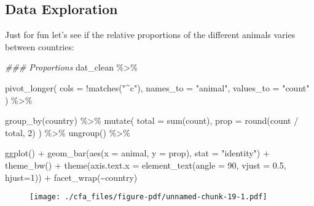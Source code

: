 \documentclass[
  letterpaper,
  DIV=11,
  numbers=noendperiod]{scrreprt}
\newenvironment{Shaded}{\begin{snugshade}}{\end{snugshade}}
\newcommand{\AttributeTok}[1]{\textcolor[rgb]{0.40,0.45,0.13}{#1}}
\newcommand{\DecValTok}[1]{\textcolor[rgb]{0.68,0.00,0.00}{#1}}
\newcommand{\DocumentationTok}[1]{\textcolor[rgb]{0.37,0.37,0.37}{\textit{#1}}}
\newcommand{\FloatTok}[1]{\textcolor[rgb]{0.68,0.00,0.00}{#1}}
\newcommand{\FunctionTok}[1]{\textcolor[rgb]{0.28,0.35,0.67}{#1}}
\newcommand{\NormalTok}[1]{\textcolor[rgb]{0.00,0.23,0.31}{#1}}
\newcommand{\SpecialCharTok}[1]{\textcolor[rgb]{0.37,0.37,0.37}{#1}}
\newcommand{\StringTok}[1]{\textcolor[rgb]{0.13,0.47,0.30}{#1}}
\begin{document}
\hypertarget{data-exploration-1}{%
\subsection*{Data Exploration}\label{data-exploration-1}}

Just for fun let's see if the relative proportions of the different
animals varies between countries:

\begin{Shaded}
\begin{Highlighting}[]
\DocumentationTok{\#\#\# Proportions}
\NormalTok{dat\_clean }\SpecialCharTok{\%\textgreater{}\%} 
  
  \FunctionTok{pivot\_longer}\NormalTok{(}
    \AttributeTok{cols      =} \SpecialCharTok{!}\FunctionTok{matches}\NormalTok{(}\StringTok{"\^{}c"}\NormalTok{),}
    \AttributeTok{names\_to  =} \StringTok{"animal"}\NormalTok{,}
    \AttributeTok{values\_to =} \StringTok{"count"}
\NormalTok{  ) }\SpecialCharTok{\%\textgreater{}\%} 
  
  \FunctionTok{group\_by}\NormalTok{(country) }\SpecialCharTok{\%\textgreater{}\%} 
  \FunctionTok{mutate}\NormalTok{(}
    \AttributeTok{total =} \FunctionTok{sum}\NormalTok{(count), }
    \AttributeTok{prop  =} \FunctionTok{round}\NormalTok{(count }\SpecialCharTok{/}\NormalTok{ total, }\DecValTok{2}\NormalTok{)}
\NormalTok{  ) }\SpecialCharTok{\%\textgreater{}\%} 
  \FunctionTok{ungroup}\NormalTok{() }\SpecialCharTok{\%\textgreater{}\%} 

  \FunctionTok{ggplot}\NormalTok{() }\SpecialCharTok{+} 
  \FunctionTok{geom\_bar}\NormalTok{(}\FunctionTok{aes}\NormalTok{(}\AttributeTok{x =}\NormalTok{ animal, }\AttributeTok{y =}\NormalTok{ prop), }\AttributeTok{stat =} \StringTok{"identity"}\NormalTok{) }\SpecialCharTok{+} 
  \FunctionTok{theme\_bw}\NormalTok{() }\SpecialCharTok{+} 
  \FunctionTok{theme}\NormalTok{(}\AttributeTok{axis.text.x =} \FunctionTok{element\_text}\NormalTok{(}\AttributeTok{angle =} \DecValTok{90}\NormalTok{, }\AttributeTok{vjust =} \FloatTok{0.5}\NormalTok{, }\AttributeTok{hjust=}\DecValTok{1}\NormalTok{)) }\SpecialCharTok{+}
  \FunctionTok{facet\_wrap}\NormalTok{(}\SpecialCharTok{\textasciitilde{}}\NormalTok{country)}
\end{Highlighting}
\end{Shaded}

\begin{figure}[H]

{\centering \texttt{[image: ./cfa\_files/figure-pdf/unnamed-chunk-19-1.pdf]}

}

\end{figure}
\end{document}
